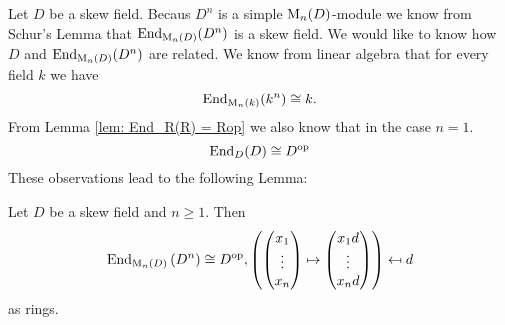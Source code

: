 Let $D$ be a skew field. Becaus $D^n$ is a simple $\operatorname{M}_n(D)$-module we know from Schur’s Lemma that $\operatorname{End}_{\operatorname{M}_n(D)}(D^n)$ is a skew field. We would like to know how $D$ and $\operatorname{End}_{\operatorname{M}_n(D)}(D^n)$ are related. We know from linear algebra that for every field $k$ we have
\[
 \operatorname{End}_{\operatorname{M}_n(k)}(k^n) \cong k.
\]
From Lemma \ref{lem: End_R(R) = Rop} we also know that in the case $n = 1$. 
\[
 \operatorname{End}_D(D) \cong D^{\mathrm{op}}
\]
These observations lead to the following Lemma:


\begin{lem}
 Let $D$ be a skew field and $n \geq 1$. Then
 \[
  \operatorname{End}_{\operatorname{M}_n(D)}\left(D^n\right) \cong D^{\mathrm{op}},
  \left( \begin{pmatrix}x_1 \\ \vdots \\ x_n\end{pmatrix} \mapsto \begin{pmatrix}x_1 d \\ \vdots \\ x_n d\end{pmatrix} \right) \mapsfrom d
 \]
 as rings.
\end{lem}
